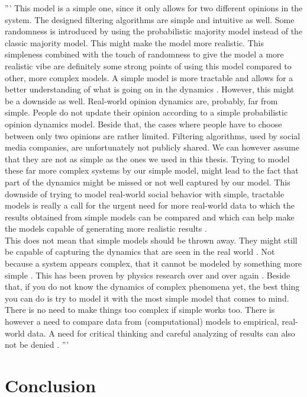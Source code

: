 \documentclass[11 pt , letterpaper , twoside , openright]{book}
\begin{document}
''' This model is a simple one, since it only allows for two different opinions in the system. The designed filtering algorithms are simple and intuitive as well. Some randomness is introduced by using the probabilistic majority model instead of the classic majority model. This might make the model more realistic. This simpleness combined with the touch of randomness to give the model a more realistic vibe are definitely some strong points of using this model compared to other, more complex models. A simple model is more tractable and allows for a better understanding of what is going on in the dynamics \cite{Jed2019}. However, this might be a downside as well. Real-world opinion dynamics are, probably, far from simple. People do not update their opinion according to a simple probabilistic opinion dynamics model. Beside that, the cases where people have to choose between only two opinions are rather limited. Filtering algorithms, used by social media companies, are unfortunately not publicly shared. We can however assume that they are not as simple as the ones we used in this thesis. Trying to model these far more complex systems by our simple model, might lead to the fact that part of the dynamics might be missed or not well captured by our model. This downside of trying to model real-world social behavior with simple, tractable models is really a call for the urgent need for more real-world data to which the results obtained from simple models can be compared and which can help make the models capable of generating more realistic results \cite{Castellano2009}\cite{Pawel}. \\
\newline
This does not mean that simple models should be thrown away. They might still be capable of capturing the dynamics that are seen in the real world \cite{Gug2015}. Not because a system appears complex, that it cannot be modeled by something more simple \cite{Jed2019}. This has been proven by physics research over and over again \cite{Gug2015}. Beside that, if you do not know the dynamics of complex phenomena yet, the best thing you can do is try to model it with the most simple model that comes to mind. There is no need to make things too complex if simple works too. There is however a need to compare data from (computational) models to empirical, real-world data. A need for critical thinking and careful analyzing of results can also not be denied \cite{Pawel}. '''

\chapter{Conclusion}
\end{document}
